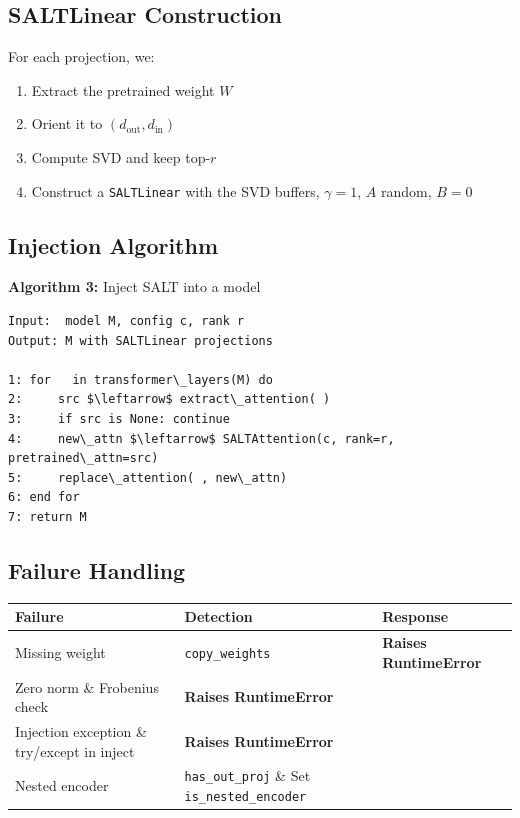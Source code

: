 \subsection{SALTLinear Construction}

For each projection, we:

\begin{enumerate}
\item Extract the pretrained weight $W$
\item Orient it to $(d_\text{out}, d_\text{in})$
\item Compute SVD and keep top-$r$
\item Construct a \texttt{SALTLinear} with the SVD buffers, $\gamma = 1$, $A$ random,
  $B = 0$

\end{enumerate}
\subsection{Injection Algorithm}

\textbf{Algorithm 3:} Inject SALT into a model
\begin{lstlisting}
Input:  model M, config c, rank r
Output: M with SALTLinear projections

1: for   in transformer\_layers(M) do
2:     src $\leftarrow$ extract\_attention( )
3:     if src is None: continue
4:     new\_attn $\leftarrow$ SALTAttention(c, rank=r, pretrained\_attn=src)
5:     replace\_attention( , new\_attn)
6: end for
7: return M
\end{lstlisting}

\subsection{Failure Handling}

\begin{table}[H]
\centering
\small
\begin{tabular}{lll}
\toprule
\textbf{Failure} & \textbf{Detection} & \textbf{Response} \\
\midrule
Missing weight & \texttt{copy\_weights} & \textbf{Raises RuntimeError} \\
Zero norm \& Frobenius check & \textbf{Raises RuntimeError} \\
Injection exception \& try/except in inject & \textbf{Raises RuntimeError} \\
Nested encoder & \texttt{has\_out\_proj} \& Set \texttt{is\_nested\_encoder} \\
\bottomrule
\end{tabular}
\end{table}

